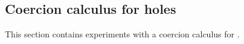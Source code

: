 \documentclass[index.tex]{subfiles}
\begin{document}
\subsection{Coercion calculus for holes}
\label{sec:coercion}
This section contains experiments with a coercion calculus for \Hazelnut{}.
 
\end{document}
